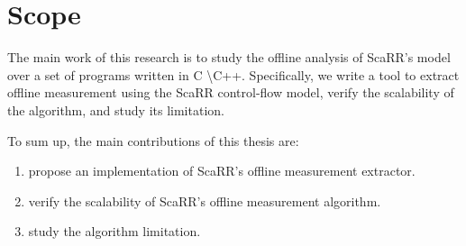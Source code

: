 
\chapter{Scope} %
\label{Chapter2} %





The main work of this research is to study the offline analysis of ScaRR's 
model~\cite{toffaliniScaRRScalableRuntime2019} over a set of programs written 
in C \textbackslash C++. 
Specifically, we write a tool to extract offline measurement using the ScaRR 
control-flow model, verify the scalability of the algorithm, and study its 
limitation.

To sum up, the main contributions of this thesis are:
\begin{enumerate}
	\item propose an implementation of ScaRR's offline measurement extractor.
	\item verify the scalability of ScaRR's offline measurement algorithm.
	\item study the algorithm limitation.
\end{enumerate}

